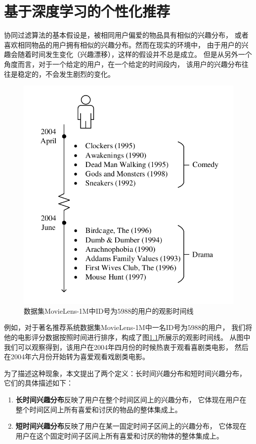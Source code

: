 \chapter{基于深度学习的个性化推荐}

协同过滤算法的基本假设是，被相同用户偏爱的物品具有相似的兴趣分布，
或者喜欢相同物品的用户拥有相似的兴趣分布。然而在现实的环境中，
由于用户的兴趣会随着时间发生变化（兴趣漂移），这样的假设并不总是成立。
但是从另外一个角度而言，对于一个给定的用户，在一个给定的时间段内，
该用户的兴趣分布往往是稳定的，不会发生剧烈的变化。

\begin{figure}[htbp]
\centering
\includegraphics[scale=0.75]{images/example.pdf}
\caption{数据集MovieLens-1M中ID号为$5988$的用户的观影时间线}
\label{fig:example}
\end{figure}

例如，对于著名推荐系统数据集MovieLens-1M中一名ID号为$5988$的用户，
我们将他的电影评分数据按照时间进行排序，构成了图\ref{fig:example}所展示的观影时间线。
从图中我们可以观察得到，该用户在2004年四月份的时候热衷于观看喜剧类电影，
然后在2004年六月份开始转为喜爱观看戏剧类电影。

为了描述这种现象，本文提出了两个定义：长时间兴趣分布和短时间兴趣分布，
它们的具体描述如下：

\begin{enumerate}
\item \textbf{长时间兴趣分布}反映了用户在整个时间区间上的兴趣分布，
它体现在用户在整个时间区间上所有喜爱和讨厌的物品的整体集成上。
\item \textbf{短时间兴趣分布}反映了用户在某一固定时间子区间上的兴趣分布，
它体现在用户在这个固定时间子区间上所有喜爱和讨厌的物体的整体集成上。
\end{enumerate}

